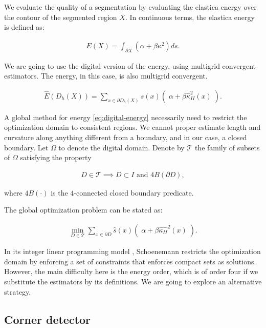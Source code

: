 \documentclass[runningheads]{llncs}
\begin{document}
We evaluate the quality of a segmentation by evaluating the elastica energy over the contour of the segmented region $X$. In continuous terms, the elastica energy is defined as:

\begin{align*}
	E(X) = \int_{\partial X}{(\alpha + \beta \kappa^2) ds}.
\end{align*}

We are going to use the digital version of the energy, using multigrid convergent estimators. The energy, in this case, is also multigrid convergent.

\begin{align}
	\hat{E}( D_h(X) ) = \sum_{x \in \partial D_h(X)}{ \hat{s}(x)\left(\; \alpha + \beta \hat{\kappa}_{II}^2(x) \; \right)}.  
	\label{eq:digital-energy}
\end{align}

A global method for energy \eqref{eq:digital-energy} necessarily need to restrict the optimization domain to consistent regions. We cannot proper estimate length and curvature along anything different from a boundary, and in our case, a closed boundary. Let $\Omega$ to denote the digital domain. Denote by $\mathcal{T}$ the family of subsets of $\Omega$ satisfying the property

\begin{align*}
	D \in \mathcal{T} \implies D \subset I \text{ and } 4B(\partial D),
\end{align*} 

where $4B(\cdot)$ is the $4$-connected closed boundary predicate. 


The global optimization problem can be stated as:

\begin{align*}
	\min_{D \in \mathcal{T}}{\sum_{x \in \partial D}{ \hat{s}(x)\left(\; \alpha + \beta \hat{\kappa_{II}}^2(x) \; \right)}.}
\end{align*}

In its integer linear programming model \cite{schoenemann09}, Schoenemann restricts the optimization domain by enforcing a set of constraints that enforces compact sets as solutions. However, the main difficulty here is the energy order, which is of order four if we substitute the estimators by its definitions. We are going to explore an alternative strategy.



\subsection{Corner detector}
\end{document}
